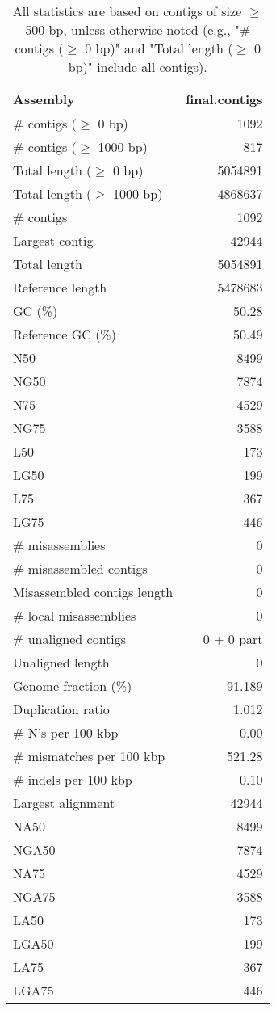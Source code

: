 \documentclass[12pt,a4paper]{article}
\begin{document}
\begin{table}[ht]
\begin{center}
\caption{All statistics are based on contigs of size $\geq$ 500 bp, unless otherwise noted (e.g., "\# contigs ($\geq$ 0 bp)" and "Total length ($\geq$ 0 bp)" include all contigs).}
\begin{tabular}{|l*{1}{|r}|}
\hline
Assembly & final.contigs \\ \hline
\# contigs ($\geq$ 0 bp) & 1092 \\ \hline
\# contigs ($\geq$ 1000 bp) & 817 \\ \hline
Total length ($\geq$ 0 bp) & 5054891 \\ \hline
Total length ($\geq$ 1000 bp) & 4868637 \\ \hline
\# contigs & 1092 \\ \hline
Largest contig & 42944 \\ \hline
Total length & 5054891 \\ \hline
Reference length & 5478683 \\ \hline
GC (\%) & 50.28 \\ \hline
Reference GC (\%) & 50.49 \\ \hline
N50 & 8499 \\ \hline
NG50 & 7874 \\ \hline
N75 & 4529 \\ \hline
NG75 & 3588 \\ \hline
L50 & 173 \\ \hline
LG50 & 199 \\ \hline
L75 & 367 \\ \hline
LG75 & 446 \\ \hline
\# misassemblies & 0 \\ \hline
\# misassembled contigs & 0 \\ \hline
Misassembled contigs length & 0 \\ \hline
\# local misassemblies & 0 \\ \hline
\# unaligned contigs & 0 + 0 part \\ \hline
Unaligned length & 0 \\ \hline
Genome fraction (\%) & 91.189 \\ \hline
Duplication ratio & 1.012 \\ \hline
\# N's per 100 kbp & 0.00 \\ \hline
\# mismatches per 100 kbp & 521.28 \\ \hline
\# indels per 100 kbp & 0.10 \\ \hline
Largest alignment & 42944 \\ \hline
NA50 & 8499 \\ \hline
NGA50 & 7874 \\ \hline
NA75 & 4529 \\ \hline
NGA75 & 3588 \\ \hline
LA50 & 173 \\ \hline
LGA50 & 199 \\ \hline
LA75 & 367 \\ \hline
LGA75 & 446 \\ \hline
\end{tabular}
\end{center}
\end{table}
\end{document}
